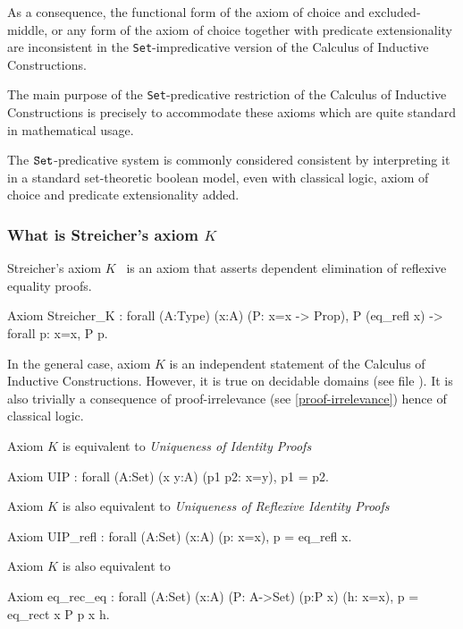 \documentclass[a4paper,pdftex]{article}
\def\Question#1{\stepcounter{question}\subsubsection{#1}}
\def\Set{{\tt Set}}
\newcommand\vfile[2]{\ahref{#1}{\tt {#2}.v}}
\begin{document}
As a consequence, the functional form of the axiom of choice and
excluded-middle, or any form of the axiom of choice together with
predicate extensionality are inconsistent in the {\Set}-impredicative
version of the Calculus of Inductive Constructions.

The main purpose of the \Set-predicative restriction of the Calculus
of Inductive Constructions is precisely to accommodate these axioms
which are quite standard in mathematical usage.

The $\Set$-predicative system is commonly considered consistent by
interpreting it in a standard set-theoretic boolean model, even with
classical logic, axiom of choice and predicate extensionality added.

\Question{What is Streicher's axiom $K$}
\label{Streicher}

Streicher's axiom $K$~\cite{HofStr98} is an axiom that asserts
dependent elimination of reflexive equality proofs.

\begin{coq_example*}
Axiom Streicher_K :
  forall (A:Type) (x:A) (P: x=x -> Prop),
    P (eq_refl x) -> forall p: x=x, P p.
\end{coq_example*}

In the general case, axiom $K$ is an independent statement of the
Calculus of Inductive Constructions.  However, it is true on decidable
domains (see file \vfile{\LogicEqdepDec}{Eqdep\_dec}). It is also
trivially a consequence of proof-irrelevance (see
\ref{proof-irrelevance}) hence of classical logic.

Axiom $K$ is equivalent to {\em Uniqueness of Identity Proofs} \cite{HofStr98}

\begin{coq_example*}
Axiom UIP : forall (A:Set) (x y:A) (p1 p2: x=y), p1 = p2.
\end{coq_example*}

Axiom $K$ is also equivalent to {\em Uniqueness of Reflexive Identity Proofs} \cite{HofStr98}

\begin{coq_example*}
Axiom UIP_refl : forall (A:Set) (x:A) (p: x=x), p = eq_refl x.
\end{coq_example*}

Axiom $K$ is also equivalent to 

\begin{coq_example*}
Axiom
  eq_rec_eq :
    forall (A:Set) (x:A) (P: A->Set) (p:P x) (h: x=x),
      p = eq_rect x P p x h.
\end{coq_example*}
\end{document}
